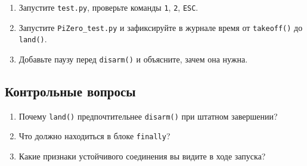 \begin{taskbox}
\begin{enumerate}
\item Запустите \texttt{test.py}, проверьте команды \texttt{1}, \texttt{2}, \texttt{ESC}.
\item Запустите \texttt{PiZero\_test.py} и зафиксируйте в журнале время от \texttt{takeoff()} до \texttt{land()}.
\item Добавьте паузу перед \texttt{disarm()} и объясните, зачем она нужна.
\end{enumerate}
\end{taskbox}

\subsection{Контрольные вопросы}
\begin{enumerate}
\item Почему \texttt{land()} предпочтительнее \texttt{disarm()} при штатном завершении?
\item Что должно находиться в блоке \texttt{finally}?
\item Какие признаки устойчивого соединения вы видите в ходе запуска?
\end{enumerate}
